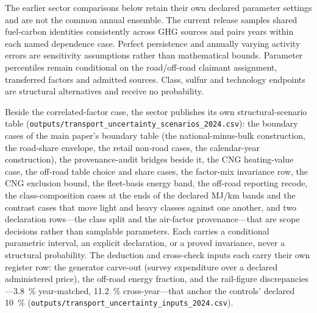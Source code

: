 The earlier sector comparisons below retain their own declared parameter settings and are not the common annual ensemble. The current release samples shared fuel-carbon identities consistently across GHG sources and pairs years within each named dependence case. Perfect persistence and annually varying activity errors are sensitivity assumptions rather than mathematical bounds. Parameter percentiles remain conditional on the road/off-road claimant assignment, transferred factors and admitted sources. Class, sulfur and technology endpoints are structural alternatives and receive no probability.

Beside the correlated-factor case, the sector publishes its own structural-scenario
table (\texttt{outputs/transport\_uncertainty\_scenarios\_2024.csv}): the boundary cases
of the main paper's boundary table (the national-minus-bulk construction, the road-share
envelope, the retail non-road cases, the calendar-year construction), the provenance-audit
bridges beside it, the CNG heating-value case, the off-road \NtwoO{}
table choice and share cases, the factor-mix invariance row, the CNG exclusion bound, the
fleet-basis energy band, the off-road reporting recode, the class-composition cases at the
ends of the declared MJ/km bands and the contrast cases that move light and heavy classes
against one another, and two declaration rows---the class split and the air-factor
provenance---that are scope decisions rather than samplable parameters. Each carries a conditional parametric interval, an explicit
declaration, or a proved invariance, never a structural probability. The deduction and
cross-check inputs each carry their own register row: the generator carve-out (survey
expenditure over a declared administered price), the off-road energy fraction,
and the rail-figure discrepancies---\SI{3.8}{\percent} year-matched,
\SI{11.2}{\percent} cross-year---that anchor the controls' declared \SI{10}{\percent}
(\texttt{outputs/transport\_uncertainty\_inputs\_2024.csv}).
